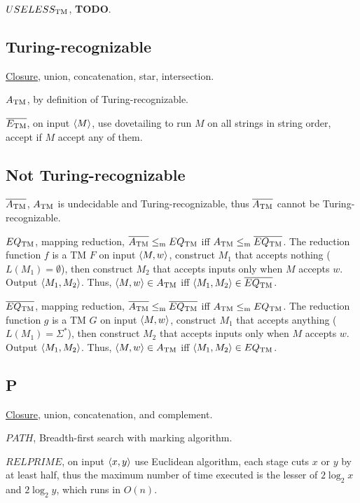 \hyperref[lang:USELESSTM_UDCDB]{$USELESS_{\text{TM}}$}, \textbf{TODO}.
\subsection{Turing-recognizable}

\hyperref[exe:TR_CLOSURE]{Closure}, union, concatenation, star, intersection.

\hyperref[lang:ATM_TR]{$A_{\text{TM}}$}, by definition of Turing-recognizable.

\hyperref[lang:ETMC_TR]{$\overline{E_{\text{TM}}}$}, on input $\langle{M}\rangle$, use dovetailing to run $M$ on all strings in string order, accept if $M$ accept any of them.

\subsection{Not Turing-recognizable}

\hyperref[lang:ATMC_NTR]{$\overline{A_{\text{TM}}}$}, $A_{\text{TM}}$ is undecidable and Turing-recognizable, thus $\overline{A_{\text{TM}}}$ cannot be Turing-recognizable.

\hyperref[lang:EQTM_NTR]{$EQ_{\text{TM}}$}, mapping reduction, $\overline{A_{\text{TM}}} \leq_{\text{m}} EQ_{\text{TM}}$ iff $A_{\text{TM}} \leq_{\text{m}} \overline{EQ_{\text{TM}}}$. The reduction function $f$ is a TM $F$ on input $\langle{M, w}\rangle$, construct $M_1$ that accepts nothing ($L(M_1) = \emptyset$), then construct $M_2$ that accepts inputs only when $M$ accepts $w$. Output $\langle{M_1, M_2}\rangle$. Thus, $\langle{M, w}\rangle\in A_{\text{TM}}$ iff $\langle{M_1, M_2}\rangle \in \overline{EQ_{\text{TM}}}$.

\hyperref[lang:EQTMC_NTR]{$\overline{EQ_{\text{TM}}}$}, mapping reduction, $\overline{A_{\text{TM}}} \leq_{\text{m}} \overline{EQ_{\text{TM}}}$ iff $A_{\text{TM}} \leq_{\text{m}} EQ_{\text{TM}}$. The reduction function $g$ is a TM $G$ on input $\langle{M, w}\rangle$, construct $M_1$ that accepts anything ($L(M_1) = \Sigma^*$), then construct $M_2$ that accepts inputs only when $M$ accepts $w$. Output $\langle{M_1, M_2}\rangle$. Thus, $\langle{M, w}\rangle \in A_{\text{TM}}$ iff $\langle{M_1, M_2}\rangle \in EQ_{\text{TM}}$.

\subsection{P}
\hyperref[exe:P_CLOSURE]{Closure}, union, concatenation, and complement.

\hyperref[lang:PATH_P]{$PATH$}, Breadth-first search with marking algorithm.

\hyperref[lang:RELPRIME_P]{$RELPRIME$}, on input $\langle{x,y}\rangle$ use Euclidean algorithm, each stage cuts $x$ or $y$ by at least half, thus the maximum number of time executed is the lesser of $2\log_2 x$ and $2\log_2 y$, which runs in $O(n)$.

